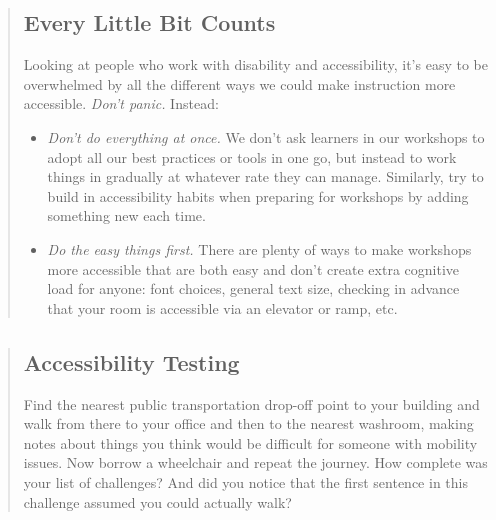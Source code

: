 \begin{quotation}   %
\subsection*{Every Little Bit Counts}

Looking at people who work with disability and accessibility, it's
easy to be overwhelmed by all the different ways we could make
instruction more accessible.  \emph{Don't panic.}  Instead:

\begin{itemize}
\item \emph{Don't do everything at once.}
We don't ask learners in our workshops to adopt all our best practices or tools in one go,
but instead to work things in gradually at whatever rate they can manage.
Similarly, try to build in accessibility habits when preparing for workshops
by adding something new each time.
\item \emph{Do the easy things first.}
There are plenty of ways to make workshops more accessible
that are both easy and don't create extra cognitive load for anyone:
font choices, general text size,
checking in advance that your room is accessible via an elevator or ramp, etc.
\end{itemize}
\end{quotation}   %

\begin{quotation}   %
\subsection*{Accessibility Testing}

Find the nearest public transportation drop-off point to your building
and walk from there to your office and then to the nearest washroom,
making notes about things you think would be difficult for someone with mobility issues.
Now borrow a wheelchair and repeat the journey.
How complete was your list of challenges?
And did you notice that the first sentence in this challenge
assumed you could actually walk?
\end{quotation}   %

